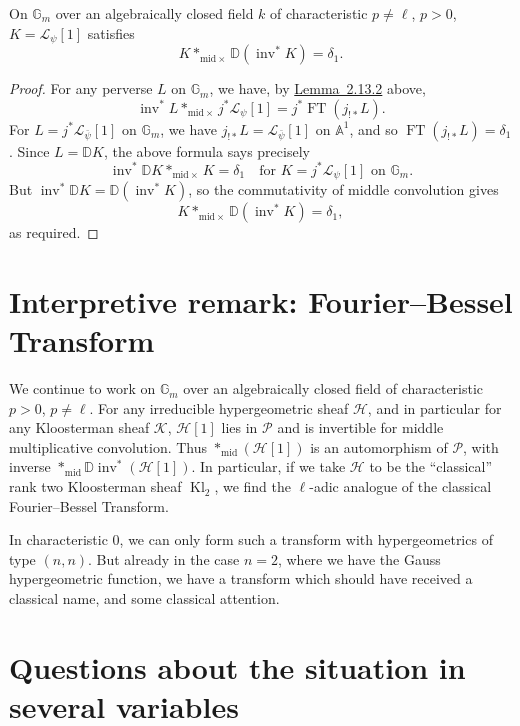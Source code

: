 On \(\mathbb{G}_m\) over an algebraically closed field \(k\) of characteristic
\(p\ne\ell\), \(p>0\), \(K=\mathcal{L}_\psi[1]\) satisfies
\[
  K*_{\mathrm{mid}\times}\mathbb{D}(\operatorname{inv}^*K)=\delta_1.
\]
\begin{proof}
For any perverse \(L\) on \(\mathbb{G}_m\), we have, by
\hyperref[lem:2.13.2]{Lemma~2.13.2} above,
\[
  \operatorname{inv}^*L*_{\mathrm{mid}\times}j^*\mathcal{L}_\psi[1]
  =
  j^*\operatorname{FT}(j_{!*}L).
\]
For \(L=j^*\mathcal{L}_{\bar{\psi}}[1]\) on \(\mathbb{G}_m\), we have
\(j_{!*}L=\mathcal{L}_{\bar{\psi}}[1]\) on \(\mathbb{A}^1\), and so
\(\operatorname{FT}(j_{!*}L)=\delta_1\). Since \(L=\mathbb{D}K\), the above
formula says precisely
\[
  \operatorname{inv}^*\mathbb{D}K*_{\mathrm{mid}\times}K=\delta_1
  \quad\text{for }K=j^*\mathcal{L}_\psi[1]\text{ on }\mathbb{G}_m.
\]
But \(\operatorname{inv}^*\mathbb{D}K=\mathbb{D}(\operatorname{inv}^*K)\), so
the commutativity of middle convolution gives
\[
  K*_{\mathrm{mid}\times}\mathbb{D}(\operatorname{inv}^*K)=\delta_1,
\]
as required.
\end{proof}

\section{Interpretive remark: Fourier--Bessel Transform}\label{sec:2.14}
We continue to work on \(\mathbb{G}_m\) over an algebraically closed field of
characteristic \(p>0\), \(p\ne\ell\). For any irreducible hypergeometric sheaf
\(\mathcal{H}\), and in particular for any Kloosterman sheaf \(\mathcal{K}\),
\(\mathcal{H}[1]\) lies in \(\mathcal{P}\) and is invertible for middle
multiplicative convolution. Thus \(*_{\mathrm{mid}}(\mathcal{H}[1])\) is an
automorphism of \(\mathcal{P}\), with inverse
\(*_{\mathrm{mid}}\mathbb{D}\operatorname{inv}^*(\mathcal{H}[1])\). In
particular, if we take \(\mathcal{H}\) to be the ``classical'' rank two
Kloosterman sheaf \(\operatorname{Kl}_2\), we find the \(\ell\)-adic analogue
of the classical Fourier--Bessel Transform.

In characteristic \(0\), we can only form such a transform with
hypergeometrics of type \((n,n)\). But already in the case \(n=2\), where we
have the Gauss hypergeometric function, we have a transform which should have
received a classical name, and some classical attention.

\section{Questions about the situation in several variables}\label{sec:2.15}

